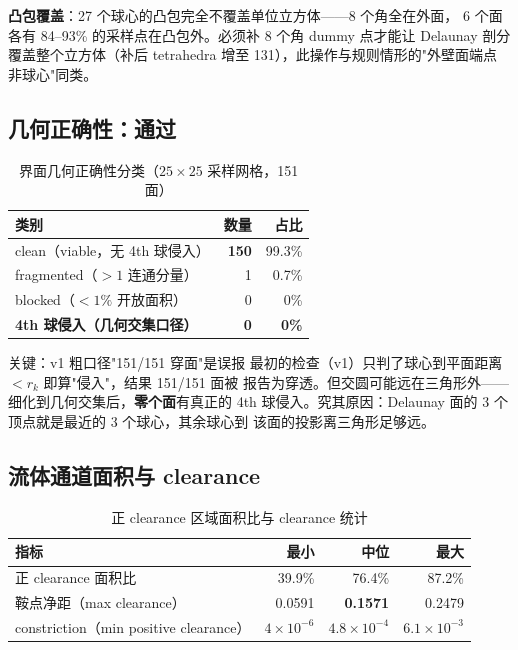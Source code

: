 \documentclass[UTF8,zihao=-4]{ctexart}
\begin{document}
\textbf{凸包覆盖}：27 个球心的凸包完全不覆盖单位立方体——8 个角全在外面，
6 个面各有 84--93\% 的采样点在凸包外。必须补 8 个角 dummy 点才能让 Delaunay
剖分覆盖整个立方体（补后 tetrahedra 增至 131），此操作与规则情形的"外壁面端点
非球心"同类。

\subsection{几何正确性：通过}

\begin{table}[htbp]
\centering
\caption{界面几何正确性分类（$25\times25$ 采样网格，151 面）}
\label{tab:viability}
\small
\begin{tabular}{lrr}
\toprule
类别 & 数量 & 占比\\
\midrule
clean（viable，无 4th 球侵入）& \textbf{150} & 99.3\%\\
fragmented（$>1$ 连通分量）& 1 & 0.7\%\\
blocked（$<1\%$ 开放面积）& 0 & 0\%\\
\textbf{4th 球侵入（几何交集口径）} & \textbf{0} & \textbf{0\%}\\
\bottomrule
\end{tabular}
\end{table}

\smallskip

\begin{keybox}{关键：v1 粗口径"151/151 穿面"是误报}
最初的检查（v1）只判了球心到平面距离 $<r_k$ 即算"侵入"，结果 151/151 面被
报告为穿透。但交圆可能远在三角形外——细化到几何交集后，\textbf{零个面}有真正的
4th 球侵入。究其原因：Delaunay 面的 3 个顶点就是最近的 3 个球心，其余球心到
该面的投影离三角形足够远。
\end{keybox}

\subsection{流体通道面积与 clearance}

\begin{table}[htbp]
\centering
\caption{正 clearance 区域面积比与 clearance 统计}
\label{tab:clearance}
\small
\begin{tabular}{lrrr}
\toprule
指标 & 最小 & 中位 & 最大\\
\midrule
正 clearance 面积比 & 39.9\% & 76.4\% & 87.2\%\\
鞍点净距（max clearance）& 0.0591 & \textbf{0.1571} & 0.2479\\
constriction（min positive clearance）& $4\times10^{-6}$ & $4.8\times10^{-4}$ & $6.1\times10^{-3}$\\
\bottomrule
\end{tabular}
\end{table}
\end{document}
